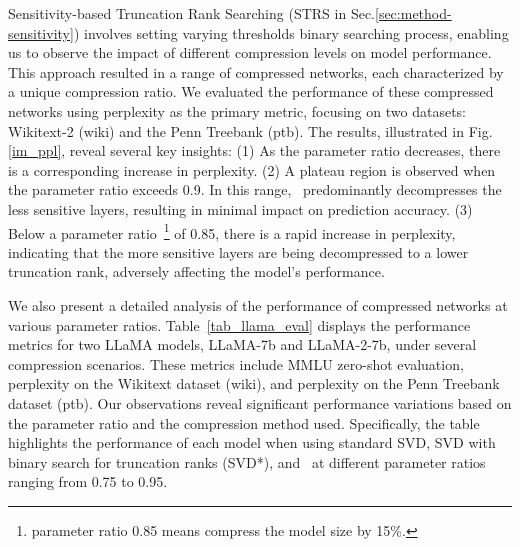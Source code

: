 Sensitivity-based Truncation Rank Searching (STRS in Sec.\ref{sec:method-sensitivity}) involves setting varying thresholds binary searching process, enabling us to observe the impact of different compression levels on model performance. This approach resulted in a range of compressed networks, each characterized by a unique compression ratio. 
We evaluated the performance of these compressed networks using perplexity as the primary metric, focusing on two datasets: Wikitext-2 (wiki) and the Penn Treebank (ptb). 
The results, illustrated in Fig.\ref{im_ppl}, reveal several key insights:
(1) As the parameter ratio decreases, there is a corresponding increase in perplexity. 
(2) A plateau region is observed when the parameter ratio exceeds 0.9. In this range, \asvd~predominantly decompresses the less sensitive layers, resulting in minimal impact on prediction accuracy.
(3) Below a parameter ratio~\footnote{parameter ratio 0.85 means compress the model size by 15\%.} of 0.85, there is a rapid increase in perplexity, indicating that the more sensitive layers are being decompressed to a lower truncation rank, adversely affecting the model's performance.

We also present a detailed analysis of the performance of compressed networks at various parameter ratios. 
Table~\ref{tab_llama_eval} displays the performance metrics for two LLaMA models, LLaMA-7b and LLaMA-2-7b, under several compression scenarios. These metrics include MMLU zero-shot evaluation, perplexity on the Wikitext dataset (wiki), and perplexity on the Penn Treebank dataset (ptb).
Our observations reveal significant performance variations based on the parameter ratio and the compression method used. Specifically, the table highlights the performance of each model when using standard SVD, SVD with binary search for truncation ranks (SVD*), and \asvd~at different parameter ratios ranging from 0.75 to 0.95.

